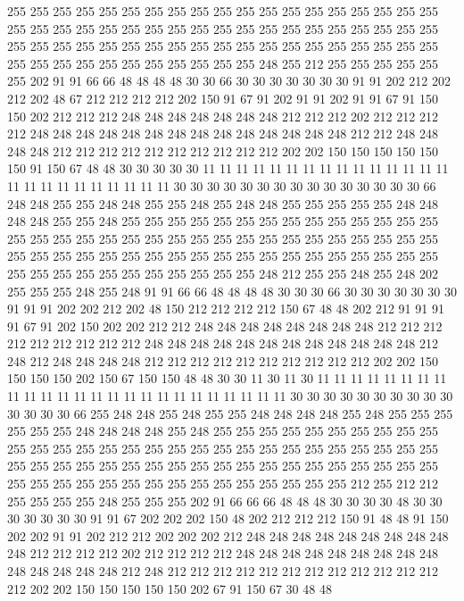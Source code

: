 255 255 255 255 255 255 255 255 255 255 255 255 255 255 255 255 255 255 255 255
255 255 255 255 255 255 255 255 255 255 255 255 255 255 255 255 255 255 255 255
255 255 255 255 255 255 255 255 255 255 255 255 255 255 255 255 255 255 255 255
255 255 255 255 255 255 255 255 248 255 212 255 255 255 255 255 255 202 91 91
66 66 48 48 48 48 30 30 66 30 30 30 30 30 30 30 91 91 202 212
202 212 202 48 67 212 212 212 212 202 150 91 67 91 202 91 91 202 91 91
67 91 150 150 202 212 212 212 248 248 248 248 248 248 248 212 212 212 202 212
212 212 212 248 248 248 248 248 248 248 248 248 248 248 248 248 248 212 212 248
248 248 248 212 212 212 212 212 212 212 212 212 212 202 202 150 150 150 150 150
150 91 150 67 48 48 30 30 30 30 30 11 11 11 11 11 11 11 11 11
11 11 11 11 11 11 11 11 11 11 11 11 11 11 11 11 30 30 30 30
30 30 30 30 30 30 30 30 30 30 30 66 248 248 255 255 248 248 255 255
248 255 248 248 255 255 255 255 255 248 248 248 248 255 255 248 255 255 255 255
255 255 255 255 255 255 255 255 255 255 255 255 255 255 255 255 255 255 255 255
255 255 255 255 255 255 255 255 255 255 255 255 255 255 255 255 255 255 255 255
255 255 255 255 255 255 255 255 255 255 255 255 255 255 255 255 255 255 255 248
212 255 255 248 255 248 202 255 255 255 248 255 248 91 91 66 66 48 48 48
48 30 30 30 66 30 30 30 30 30 30 30 91 91 91 202 202 212 202 48
150 212 212 212 212 150 67 48 48 202 212 91 91 91 91 67 91 202 150 202
202 212 212 248 248 248 248 248 248 248 248 212 212 212 212 212 212 212 212 212
248 248 248 248 248 248 248 248 248 248 248 248 212 248 212 248 248 248 248 212
212 212 212 212 212 212 212 212 212 202 202 150 150 150 150 202 150 67 150 150
48 48 30 30 11 30 11 30 11 11 11 11 11 11 11 11 11 11 11 11
11 11 11 11 11 11 11 11 11 11 11 11 11 30 30 30 30 30 30 30
30 30 30 30 30 30 30 66 255 248 248 255 248 255 255 248 248 248 248 255
248 255 255 255 255 255 255 248 248 248 248 255 248 255 255 255 255 255 255 255
255 255 255 255 255 255 255 255 255 255 255 255 255 255 255 255 255 255 255 255
255 255 255 255 255 255 255 255 255 255 255 255 255 255 255 255 255 255 255 255
255 255 255 255 255 255 255 255 255 255 255 255 255 255 255 255 212 255 212 212
255 255 255 255 248 255 255 255 202 91 66 66 66 48 48 48 30 30 30 30
48 30 30 30 30 30 30 30 91 91 67 202 202 202 150 48 202 212 212 212
150 91 48 48 91 150 202 202 91 91 202 212 212 202 202 202 212 248 248 248
248 248 248 248 248 248 248 212 212 212 212 202 212 212 212 212 248 248 248 248
248 248 248 248 248 248 248 248 248 248 212 248 212 212 212 212 212 212 212 212
212 212 212 212 212 202 202 150 150 150 150 150 202 67 91 150 67 30 48 48
